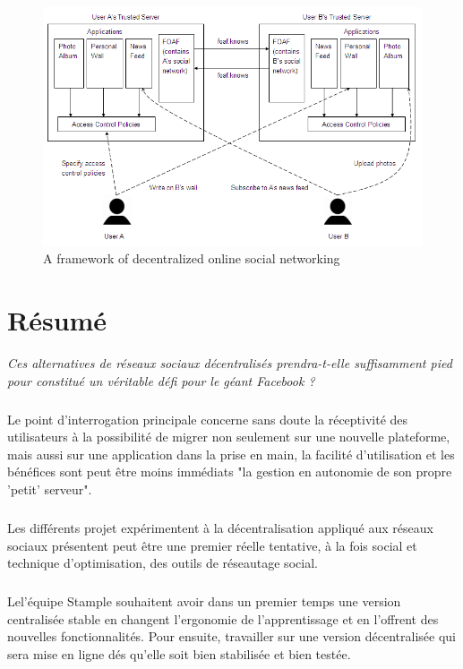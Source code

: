 \begin{figure}
        \centering
                \centering
                \includegraphics[width=\textwidth]{framework.png}
                \caption{A framework of decentralized online social networking}
                \label{fig:A framework of decentralized online social networking}
       
\end{figure}
\newpage
\section{Résumé}
\textit{Ces alternatives de réseaux sociaux décentralisés prendra-t-elle suffisamment pied pour constitué un véritable défi pour le géant Facebook ?}
\subparagraph{}
Le point d'interrogation principale concerne sans doute la réceptivité des utilisateurs à la possibilité de migrer non seulement sur une nouvelle plateforme, mais aussi sur une application dans la prise en main, la facilité d'utilisation et les bénéfices sont peut être moins immédiats "la gestion en autonomie de son propre 'petit' serveur".
\subparagraph{}
Les différents projet expérimentent à la décentralisation appliqué aux réseaux sociaux présentent peut être une premier réelle tentative, à la fois social et technique d'optimisation, des outils de réseautage social.
\subparagraph{}
Lel'équipe Stample souhaitent avoir dans un premier temps une version centralisée stable en changent l'ergonomie de l'apprentissage et en l'offrent des nouvelles fonctionnalités. Pour ensuite, travailler sur une version décentralisée qui sera mise en ligne dés qu'elle soit bien stabilisée et bien testée.  



